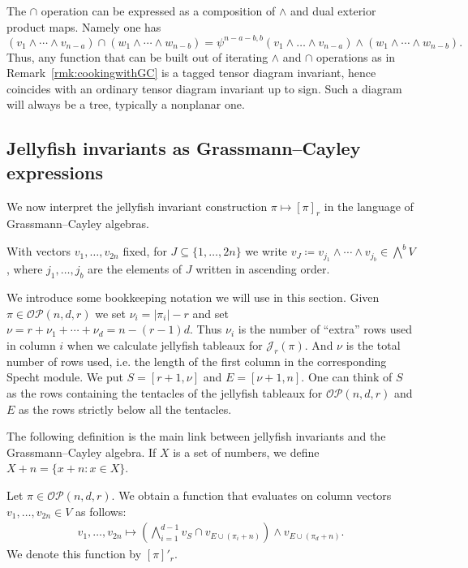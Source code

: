 \documentclass[ALCO, Unicode]{cedram}
\numberwithin{equation}{section}
\newcommand{\ordsetpart}{\mathcal{OP}}
\begin{document}
\begin{remark}\label{rmk:WLOG}
The $\cap$ operation can be expressed as a composition of $\wedge$ and dual exterior product maps. Namely one has 
\[(v_1 \wedge\cdots\wedge v_{n-a}) \cap (w_1 \wedge \cdots \wedge w_{n-b}) = \psi^{n-a-b,b}(v_1\wedge\dots\wedge v_{n-a}) \wedge (w_1 \wedge \cdots \wedge w_{n-b}).\]
Thus, any function that can be built out of iterating $\wedge$ and $\cap$ operations as in Remark~\ref{rmk:cookingwithGC} is a tagged tensor diagram invariant, hence coincides with an ordinary tensor diagram invariant up to sign. Such a diagram will always be a tree, typically a nonplanar one.
\end{remark}



\subsection{Jellyfish invariants as Grassmann--Cayley expressions}
We now interpret the jellyfish invariant construction $\pi \mapsto [\pi]_r$ in the language of Grassmann--Cayley algebras. 

With vectors $v_1,\dots,v_{2n}$ fixed, for $J \subseteq \{1,\ldots,2n\}$ we write $v_J \coloneqq v_{j_1} \wedge \cdots \wedge v_{j_b} \in \bigwedge^b V$, where $j_1,\dots,j_b$ are the elements of $J$ written in ascending order. 

We introduce some bookkeeping notation we will use in this section. Given $\pi \in \ordsetpart(n,d,r)$ we set $\nu_i = |\pi_i| - r$ and set $\nu = r+\nu_1+\cdots +\nu_d = n-(r-1)d$. Thus $\nu_i$ is the number of ``extra'' rows used in column $i$ when we calculate jellyfish tableaux for $\mathcal{J}_r(\pi)$. And $\nu$ is the total number of rows used, i.e. the length of the first column in the corresponding Specht module. 
We put 
$S = [r+1,\nu]$ and $E = [\nu+1,n]$. One can think of $S$ as the rows containing the tentacles of the jellyfish tableaux for $\mathcal{OP}(n,d,r)$ and $E$ as the rows strictly below all the tentacles.


The following definition is the main link between jellyfish invariants and the Grassmann--Cayley algebra. If $X$ is a set of numbers, we define $X+ n = \{ x + n : x \in X\}$.
\begin{definition}
\label{def:web_inv}
Let $\pi \in \ordsetpart(n,d,r)$. We obtain a function that evaluates on column vectors $v_1,\dots,v_{2n} \in V$ as follows: 
\begin{align}\label{eq:meetjellyfish}
v_1,\dots,v_{2n} \mapsto \left(\bigwedge_{i=1}^{d-1} v_{S} \cap v_{E \cup (\pi_i+n)} \right) \wedge v_{E \cup (\pi_d+n)}.
\end{align}
We denote this function by $[\pi]'_r$. 
\end{definition}
\end{document}
